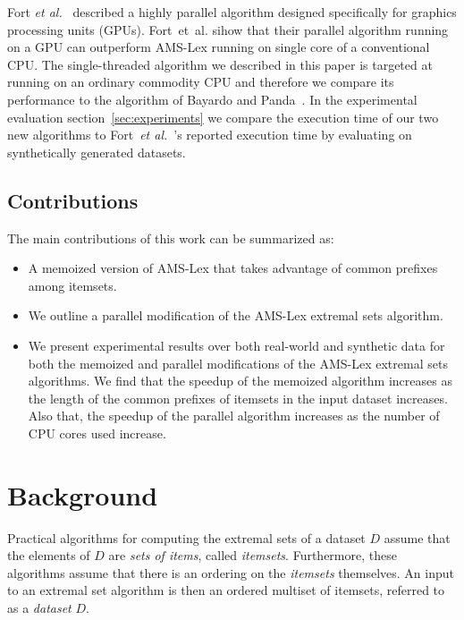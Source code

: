 \documentclass[13pt,a4paper]{article}
\begin{document}
Fort \textit{et al.}~\cite{Fort+13} described a highly parallel algorithm designed specifically for graphics processing units (GPUs). Fort~et~al. sihow that their parallel algorithm running on a GPU can outperform AMS-Lex running on single core of a conventional CPU. The single-threaded algorithm we described in this paper is targeted at running on an ordinary commodity CPU and therefore we compare its performance to the algorithm of Bayardo and Panda~\cite{BayardoPanda11}. In the experimental evaluation section~\ref{sec:experiments} we compare the execution time of our two new algorithms to Fort~\textit{et al.}~\cite{Fort+13}'s reported execution time by evaluating on synthetically generated datasets.

\subsection{Contributions}
\label{sec:intro:contributions}
The main contributions of this work can be summarized as:

\begin{itemize}
	\item A memoized version of AMS-Lex that takes advantage of common prefixes among itemsets.
    \item We outline a parallel modification of the AMS-Lex extremal sets algorithm.
    \item We present experimental results over both real-world and synthetic data for both the memoized and parallel modifications of the AMS-Lex extremal sets algorithms. We find that the speedup of the memoized algorithm increases as the length of the common prefixes of itemsets in the input dataset increases. Also that, the speedup of the parallel algorithm increases as the number of CPU cores used increase. 
\end{itemize}



\section{Background}
\label{sec:background}

Practical algorithms for computing the extremal sets of a dataset $D$ assume that the elements of $D$ are \textit{sets of items}, called \textit{itemsets}. Furthermore, these algorithms assume that there is an ordering on the \textit{itemsets} themselves. An input to an extremal set algorithm is then an ordered multiset of itemsets, referred to as a \textit{dataset} $D$.
\end{document}
